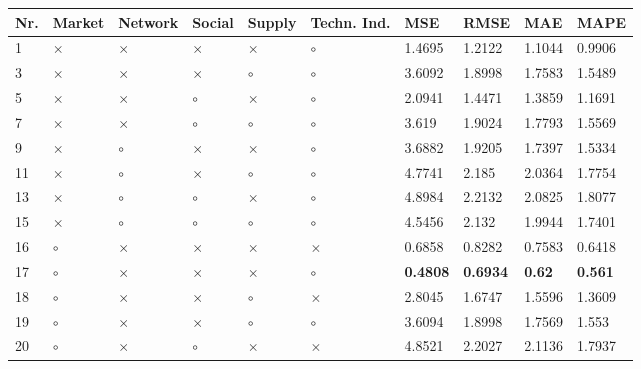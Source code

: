 \begin{table}[H]
\centering
\begin{tabular}{|P{0.7cm}|P{1.3cm}P{1.3cm}P{1.3cm}P{1.3cm}P{1.3cm}|P{1.1cm}P{1.1cm}P{1.1cm}P{1.1cm}|}
\hline
 Nr. &   Market &  Network &   Social &   Supply & Techn. Ind. &             MSE &            RMSE &           MAE &           MAPE \\
 & $\times$ & $\times$ & $\times$ & $\times$ &     $\circ$ &          1.4695 &          1.2122 &        1.1044 &         0.9906 \\
   3 & $\times$ & $\times$ & $\times$ &  $\circ$ &     $\circ$ &          3.6092 &          1.8998 &        1.7583 &         1.5489 \\
   5 & $\times$ & $\times$ &  $\circ$ & $\times$ &     $\circ$ &          2.0941 &          1.4471 &        1.3859 &         1.1691 \\
   7 & $\times$ & $\times$ &  $\circ$ &  $\circ$ &     $\circ$ &           3.619 &          1.9024 &        1.7793 &         1.5569 \\
   9 & $\times$ &  $\circ$ & $\times$ & $\times$ &     $\circ$ &          3.6882 &          1.9205 &        1.7397 &         1.5334 \\
  11 & $\times$ &  $\circ$ & $\times$ &  $\circ$ &     $\circ$ &          4.7741 &           2.185 &        2.0364 &         1.7754 \\
  13 & $\times$ &  $\circ$ &  $\circ$ & $\times$ &     $\circ$ &          4.8984 &          2.2132 &        2.0825 &         1.8077 \\
  15 & $\times$ &  $\circ$ &  $\circ$ &  $\circ$ &     $\circ$ &          4.5456 &           2.132 &        1.9944 &         1.7401 \\
  16 &  $\circ$ & $\times$ & $\times$ & $\times$ &    $\times$ &          0.6858 &          0.8282 &        0.7583 &         0.6418 \\
  17 &  $\circ$ & $\times$ & $\times$ & $\times$ &     $\circ$ & \textbf{0.4808} & \textbf{0.6934} & \textbf{0.62} & \textbf{0.561} \\
  18 &  $\circ$ & $\times$ & $\times$ &  $\circ$ &    $\times$ &          2.8045 &          1.6747 &        1.5596 &         1.3609 \\
  19 &  $\circ$ & $\times$ & $\times$ &  $\circ$ &     $\circ$ &          3.6094 &          1.8998 &        1.7569 &          1.553 \\
  20 &  $\circ$ & $\times$ &  $\circ$ & $\times$ &    $\times$ &          4.8521 &          2.2027 &        2.1136 &         1.7937 \\

\end{tabular}
\end{table}
